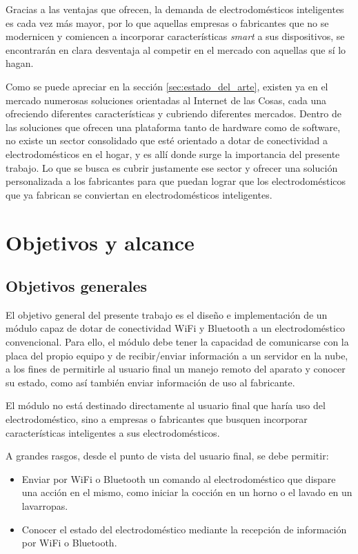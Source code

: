Gracias a las ventajas que ofrecen, la demanda de electrodomésticos inteligentes es cada vez más mayor, por lo que aquellas empresas o fabricantes que no se modernicen y comiencen a incorporar características \emph{smart} a sus dispositivos, se encontrarán en clara desventaja
al competir en el mercado con aquellas que sí lo hagan.

Como se puede apreciar en la sección \ref{sec:estado_del_arte}, existen ya en el mercado numerosas soluciones orientadas al Internet de las Cosas, cada una ofreciendo diferentes características y cubriendo diferentes mercados. Dentro de las soluciones que ofrecen una plataforma tanto de hardware como de software, no existe un sector consolidado que esté orientado a dotar de conectividad a electrodomésticos en el hogar, y es allí donde surge la importancia del presente trabajo. Lo que se busca es cubrir justamente ese sector y ofrecer una solución personalizada a los fabricantes para que puedan lograr que los electrodomésticos que ya fabrican se conviertan en electrodomésticos inteligentes.


\section{Objetivos y alcance{}}

\subsection{Objetivos generales}

El objetivo general del presente trabajo es el diseño e implementación de un módulo capaz de dotar de conectividad WiFi y Bluetooth a un electrodoméstico convencional. Para ello, el módulo debe tener la capacidad de comunicarse con la placa del propio equipo y de recibir/enviar información a un servidor en la nube, a los fines de permitirle al usuario final un manejo remoto del aparato y conocer su estado, como así también enviar información de uso al fabricante. 

El módulo no está destinado directamente al usuario final que haría uso del electrodoméstico, sino a empresas o fabricantes que busquen incorporar características inteligentes a sus electrodomésticos.

A grandes rasgos, desde el punto de vista del usuario final, se debe permitir:
\begin{itemize}
	\item Enviar por WiFi o Bluetooth un comando al electrodoméstico que dispare una acción en el mismo, como iniciar la cocción en un horno o el lavado en un lavarropas.
	\item Conocer el estado del electrodoméstico mediante la recepción de información por WiFi o Bluetooth.
\end{itemize}

